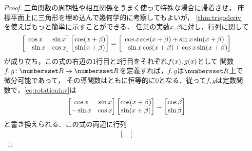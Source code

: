 \documentclass[11pt,a4paper]{ltjsarticle}
\theoremstyle{definition}
\begin{document}
\begin{proof}
  三角関数の周期性や相互関係をうまく使って特殊な場合に帰着させ，
  座標平面上に三角形を埋め込んで幾何学的に考察してもよいが，
  \cref{thm:trigoderiv}を使えばもっと簡単に示すことができる．
  任意の実数$x, \beta$に対し，行列に関して
  \begin{align}
    \begin{bmatrix}
      \cos x   & \sin x \\
      - \sin x & \cos x \\
    \end{bmatrix}
    \begin{bmatrix}
      \apply{\cos}{x + \beta} \\
      \apply{\sin}{x + \beta} \\
    \end{bmatrix}
    =
    \begin{bmatrix}
      \cos x \apply{\cos}{x + \beta} + \sin x \apply{\sin}{x + \beta}   \\
      - \sin x \apply{\cos}{x + \beta} + \cos x \apply{\sin}{x + \beta} \\
    \end{bmatrix}
    \label{eq:rotationinv}
  \end{align}
  が成り立ち，この式の右辺の1行目と2行目をそれぞれ$\apply{f}{x}, \apply{g}{x}$として
  関数$f,g \colon \Real \to \Real$を定義すれば，$f,g$は$\Real$上で微分可能であって，
  その導関数はともに恒等的に0となる．従って$f,g$は定数関数で，\cref{eq:rotationinv}は
  \begin{align}
    \begin{bmatrix}
      \cos x   & \sin x \\
      - \sin x & \cos x \\
    \end{bmatrix}
    \begin{bmatrix}
      \apply{\cos}{x + \beta} \\
      \apply{\sin}{x + \beta} \\
    \end{bmatrix}
    =
    \begin{bmatrix}
      \cos \beta \\
      \sin \beta \\
    \end{bmatrix}
    \label{eq:rotationinvbeta}
  \end{align}
  と書き換えられる．この式の両辺に行列
  \begin{align*}
    \begin{bmatrix}

\end{bmatrix}
\end{align*}
\end{proof}
\end{document}
